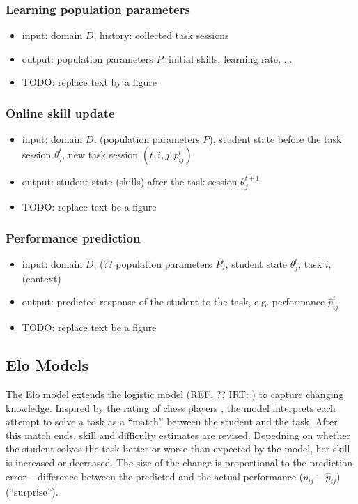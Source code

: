 \subsubsection{Learning population parameters}
\begin{itemize}
\item input: domain $D$, history: collected task sessions
\item output: population parameters $P$: initial skills, learning rate, ...
\item TODO: replace text by a figure
\end{itemize}

\subsubsection{Online skill update}
\begin{itemize}
\item input: domain $D$, (population parameters $P$),
  student state before the task session $\theta^{t}_{j}$,
  new task session $(t, i, j, p^{t}_{ij})$
\item output: student state (skills) after the task session $\theta^{t+1}_{j}$
\item TODO: replace text be a figure
\end{itemize}

\subsubsection{Performance prediction}
\begin{itemize}
\item input: domain $D$, (?? population parameters $P$),
  student state $\theta^{t}_{j}$, task $i$, (context)
\item output: predicted response of the student to the task,
  e.g. performance $\hat{p}^t_{ij}$
\item TODO: replace text be a figure
\end{itemize}


\subsection{Elo Models}  %
\label{sec:elo}

The Elo model \cite{alg.elo, irt-elo-math}
  extends the logistic model (REF, ?? IRT: \cite{irt-visual-guide})
  to capture changing knowledge.
Inspired by the rating of chess players \cite{elo-rating},
  the model interprets each attempt  to solve a task
  as a ``match'' between the student and the task.
After this match ends, skill and difficulty estimates are revised.
Depedning on whether the student solves the task better or worse than expected
  by the model, her skill is increased or decreased.
The size of the change is proportional to the prediction error -- difference
  between the predicted and the actual performance ($p_{ij} - \hat{p}_{ij}$) (``surprise'').

